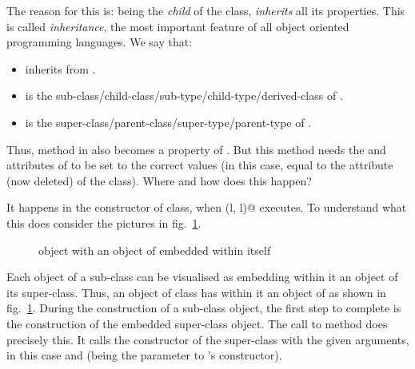 \documentclass[12pt,a4paper]{article}
\begin{document}
The reason for this is: \lstinline@Square@ being the \emph{child} of the \lstinline@Rectangle@ class, \emph{inherits} all its properties. This is called \emph{inheritance}, the most important feature of all object oriented programming languages. We say that:
\begin{itemize}
	\item \lstinline@Square@ inherits from \lstinline@Rectangle@.
	\item \lstinline@Square@ is the sub-class/child-class/sub-type/child-type/derived-class of \lstinline@Rectangle@.
	\item \lstinline@Rectangle@ is the super-class/parent-class/super-type/parent-type of \lstinline@Square@.
\end{itemize} 

Thus, \lstinline@area@ method in \lstinline@Rectangle@ also becomes a property of \lstinline@Square@. But this \lstinline@area@ method needs the \lstinline@length@ and \lstinline@breadth@ attributes of \lstinline@Rectangle@ to be set to the correct values (in this case, equal to the \lstinline@length@ attribute (now deleted) of the \lstinline@Square@ class). Where and how does this happen?

It happens in the constructor of \lstinline@Square@ class, when \lstinline@super(l, l)@ executes. To understand what this does consider the pictures in fig.~\ref{f:sup}.
\begin{figure}[H]
\begin{center}

\end{center}
\caption{\lstinline@Square@ object with an object of \lstinline@Rectangle@ embedded within itself}
\label{f:sup}
\end{figure}

Each object of a sub-class can be visualised as embedding within it an object of its super-class. Thus, an object of \lstinline@Square@ class has within it an object of \lstinline@Rectangle@ as shown in fig.~\ref{f:sup}. During the construction of a sub-class object, the first step to complete is the construction of the embedded super-class object. The call to \lstinline@super@ method does precisely this. It calls the constructor of the super-class with the given arguments, in this case \lstinline@l@ and \lstinline@l@ (\lstinline@l@ being the parameter to \lstinline@Square@'s constructor).
\end{document}
